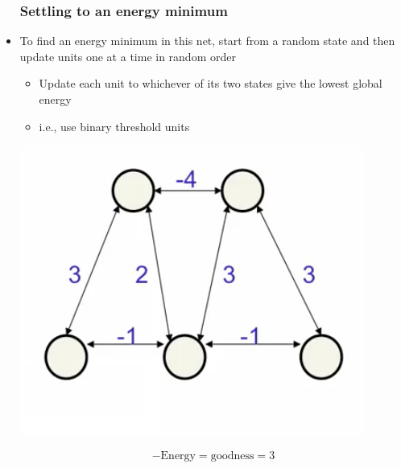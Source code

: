 \begin{itemize}
	\subsubsection{Settling to an energy minimum}
	\item To find an energy minimum in this net, start from a random state and then update units one at a time in random order
	\begin{itemize}
		\item Update each unit to whichever of its two states give the lowest global energy
		\item i.e., use binary threshold units
	\end{itemize}
	\begin{cetner}
		\includegraphics[scale=0.8]{sections/11/min.png}
	\end{cetner}
	$$-\text{Energy}=\text{goodness}=3$$


\end{itemize}
